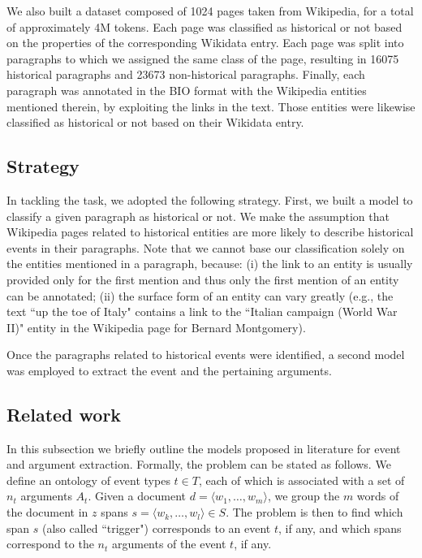 \documentclass[runningheads]{llncs}
\begin{document}
We also built a dataset composed of 1024 pages taken from Wikipedia, for a total of approximately 4M tokens. Each page was classified as historical or not based on the properties of the corresponding Wikidata entry. Each page was split into paragraphs to which we assigned the same class of the page, resulting in 16075 historical paragraphs and 23673 non-historical paragraphs. Finally, each paragraph was annotated in the BIO format with the Wikipedia entities mentioned therein, by exploiting the links in the text. Those entities were likewise classified as historical or not based on their Wikidata entry.

\subsection{Strategy}

In tackling the task, we adopted the following strategy. First, we built a model to classify a given paragraph as historical or not. We make the assumption that Wikipedia pages related to historical entities are more likely to describe historical events in their paragraphs. Note that we cannot base our classification solely on the entities mentioned in a paragraph, because: (i) the link to an entity is usually provided only for the first mention and thus only the first mention of an entity can be annotated; (ii) the surface form of an entity can vary greatly (e.g., the text “up the toe of Italy" contains a link to the “Italian campaign (World War II)" entity in the Wikipedia page for Bernard Montgomery).

Once the paragraphs related to historical events were identified, a second model was employed to extract the event and the pertaining arguments.

\subsection{Related work}

In this subsection we briefly outline the models proposed in literature for event and argument extraction. Formally, the problem can be stated as follows. We define an ontology of event types $t \in T$, each of which is associated with a set of $n_t$ arguments $A_t$. Given a document $d = \langle w_1, \dots, w_m \rangle$, we group the $m$ words of the document in $z$ spans $s = \langle w_k, \dots, w_l \rangle \in S$. The problem is then to find which span $s$ (also called “trigger") corresponds to an event $t$, if any, and which spans correspond to the $n_t$ arguments of the event $t$, if any.    
\end{document}
